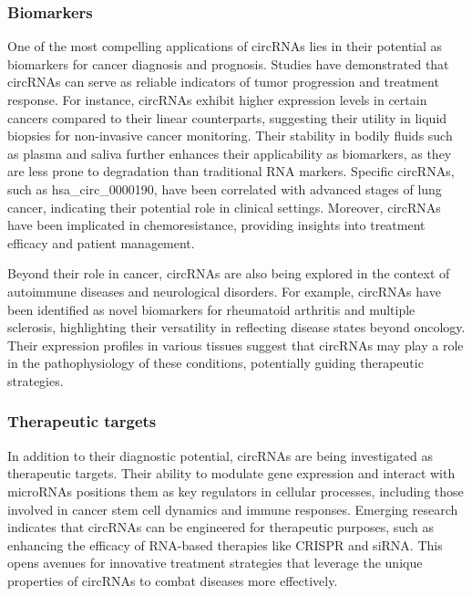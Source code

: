 \subsubsection{Biomarkers}
One of the most compelling applications of circRNAs lies in their potential as
biomarkers for cancer diagnosis and prognosis. Studies have demonstrated that
circRNAs can serve as reliable indicators of tumor progression and treatment
response. For instance, circRNAs exhibit higher expression levels in certain
cancers compared to their linear counterparts, suggesting their utility in
liquid biopsies for non-invasive cancer
monitoring\supercite{bao_prognostic_2020,ren_construction_2017}. Their stability
in bodily fluids such as plasma and saliva further
enhances their applicability as biomarkers, as they are less prone to
degradation than traditional RNA
markers\supercite{bao_prognostic_2020,zhang_circular_2018}. Specific circRNAs,
such as hsa\_circ\_0000190, have been correlated with
advanced stages of lung cancer, indicating their potential role in clinical
settings\supercite{luo_plasma_2020}. Moreover, circRNAs have been implicated in
chemoresistance, providing insights into treatment efficacy and patient
management\supercite{geng_function_2018,feng_functions_2019}.

Beyond their role in cancer, circRNAs are also being explored in the context of
autoimmune diseases and neurological disorders. For example, circRNAs have been
identified as novel biomarkers for rheumatoid arthritis and multiple sclerosis,
highlighting their versatility in reflecting disease states beyond
oncology\supercite{ouyang_identification_2021,he_exosomal_2019}. Their
expression profiles in various
tissues suggest that circRNAs may play a role in the pathophysiology of these
conditions, potentially guiding therapeutic strategies\supercite{mohammed_circular_2023}.

\subsubsection{Therapeutic targets}
In addition to their diagnostic potential, circRNAs are being investigated as
therapeutic targets. Their ability to modulate gene expression and interact with
microRNAs positions them as key regulators in cellular processes, including
those involved in cancer stem cell dynamics and immune
responses\supercite{cheng_emerging_2023}. Emerging research indicates that
circRNAs can be engineered for
therapeutic purposes, such as enhancing the efficacy of RNA-based therapies like
CRISPR and siRNA\supercite{wesselhoeft_engineering_2018}. This opens avenues for innovative
treatment strategies that leverage the unique properties of circRNAs to combat
diseases more effectively.